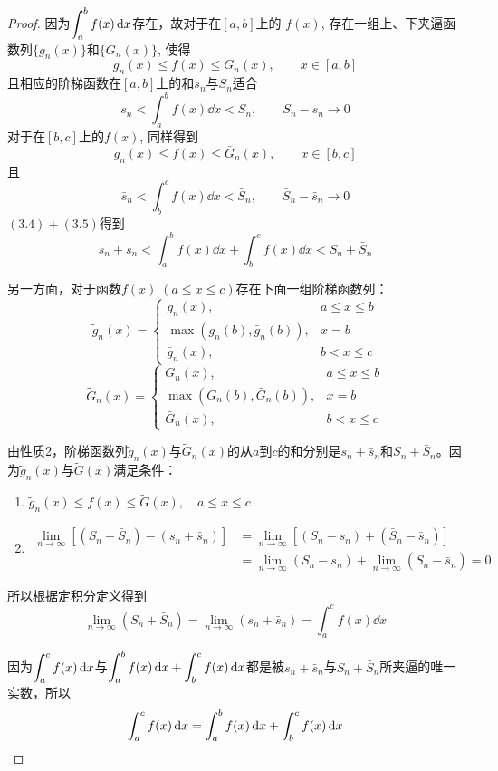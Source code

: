 \begin{proof}
因为$\displaystyle\int^b_a f(x)\,{\rm d} x$存在，故对于在$[a,b]$上的
$f(x)$, 存在一组上、下夹逼函数列$\{g_n(x)\}$和$\{G_n(x)\}$, 使得
\[g_n (x) \le f (x) \le G_n (x),\qquad x\in [a,b]\]
且相应的阶梯函数在$[a,b]$上的和$s_n$与$S_n$适合
\begin{equation}
    s_n<\int^b_a f(x)\dd x<S_n,\qquad S_n-s_n\to 0
\end{equation}
对于在$[b,c]$上的$f(x)$, 同样得到
\[\bar g_n (x) \le f (x) \le \bar G_n (x),\qquad x\in [b,c]\]
且
\begin{equation}
    \bar  s_n<\int^c_b f(x)\dd x<\bar S_n,\qquad \bar S_n-\bar s_n\to 0
\end{equation}
$(3.4)+(3.5)$得到
\begin{equation}
    s_n+ \bar  s_n<\int^b_a f(x)\dd x+\int^c_b f(x)\dd x<S_n+\bar S_n
\end{equation}

另一方面，对于函数$f(x)\; (a\le x\le c)$存在下面一组阶梯函数列：
\[\tilde g_n(x)=\begin{cases}
    g_n(x),  &  a\le x\le b\\
    \max\left(g_n(b), \bar g_n(b)\right),  &  x=b\\
    \bar g_n(x), & b<x\le c
\end{cases}\]
\[\tilde G_n(x)=\begin{cases}
    G_n(x),  &  a\le x\le b\\
    \max\left(G_n(b), \bar G_n(b)\right),  &  x=b\\
    \bar G_n(x), & b<x\le c
\end{cases}\]

由性质2，阶梯函数列$\tilde g_n(x)$与$\tilde G_n(x)$的从$a$到$c$的和分别是$s_n+\bar s_n$和$S_n+\bar S_n$。因为$\tilde g_n(x)$与$\tilde G(x)$满足条件：
\begin{enumerate}
    \item $\tilde g_n(x)\le f(x)\le \tilde G(x),\quad a\le x\le c$
    \item \[\begin{split}
    \lim_{n\to\infty}\left[(S_n+\bar S_n)-(s_n+\bar s_n)\right]&=\lim_{n\to\infty}\left[(S_n-s_n)+(\bar S_n-\bar s_n)\right]\\
    &=\lim_{n\to\infty}(S_n-s_n)+\lim_{n\to\infty}(\bar S_n-\bar s_n)=0
    \end{split}\]
\end{enumerate}
所以根据定积分定义得到
\[\lim_{n\to\infty}(S_n+\bar S_n)=\lim_{n\to\infty}(s_n+\bar s_n)=\int^c_a f(x)\dd x \]

因为$\displaystyle\int^c_a f(x)\,{\rm d} x $与$\displaystyle\int^b_a f(x)\,{\rm d} x +\displaystyle\int^c_b f(x)\,{\rm d} x $都是被$s_n+\bar s_n$与$S_n+\bar S_n$所夹逼的唯一实数，所以
\[\displaystyle\int^c_a f(x)\,{\rm d} x=\displaystyle\int^b_a f(x)\,{\rm d} x +\displaystyle\int^c_b f(x)\,{\rm d} x\]
\end{proof}

